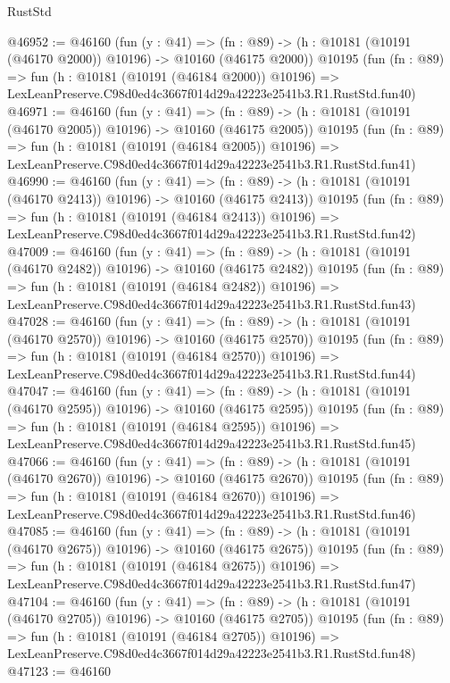 \begin{lexlean}{RustStd}
\begin{coremodule}
@46952 := @46160
    (fun (y : @41) =>
    (fn : @89) -> (h : @10181 (@10191 (@46170 @2000)) @10196) -> @10160 (@46175 @2000))
    @10195
    (fun (fn : @89) =>
    fun (h : @10181 (@10191 (@46184 @2000)) @10196) =>
    LexLeanPreserve.C98d0ed4c3667f014d29a42223e2541b3.R1.RustStd.fun40)
@46971 := @46160
    (fun (y : @41) =>
    (fn : @89) -> (h : @10181 (@10191 (@46170 @2005)) @10196) -> @10160 (@46175 @2005))
    @10195
    (fun (fn : @89) =>
    fun (h : @10181 (@10191 (@46184 @2005)) @10196) =>
    LexLeanPreserve.C98d0ed4c3667f014d29a42223e2541b3.R1.RustStd.fun41)
@46990 := @46160
    (fun (y : @41) =>
    (fn : @89) -> (h : @10181 (@10191 (@46170 @2413)) @10196) -> @10160 (@46175 @2413))
    @10195
    (fun (fn : @89) =>
    fun (h : @10181 (@10191 (@46184 @2413)) @10196) =>
    LexLeanPreserve.C98d0ed4c3667f014d29a42223e2541b3.R1.RustStd.fun42)
@47009 := @46160
    (fun (y : @41) =>
    (fn : @89) -> (h : @10181 (@10191 (@46170 @2482)) @10196) -> @10160 (@46175 @2482))
    @10195
    (fun (fn : @89) =>
    fun (h : @10181 (@10191 (@46184 @2482)) @10196) =>
    LexLeanPreserve.C98d0ed4c3667f014d29a42223e2541b3.R1.RustStd.fun43)
@47028 := @46160
    (fun (y : @41) =>
    (fn : @89) -> (h : @10181 (@10191 (@46170 @2570)) @10196) -> @10160 (@46175 @2570))
    @10195
    (fun (fn : @89) =>
    fun (h : @10181 (@10191 (@46184 @2570)) @10196) =>
    LexLeanPreserve.C98d0ed4c3667f014d29a42223e2541b3.R1.RustStd.fun44)
@47047 := @46160
    (fun (y : @41) =>
    (fn : @89) -> (h : @10181 (@10191 (@46170 @2595)) @10196) -> @10160 (@46175 @2595))
    @10195
    (fun (fn : @89) =>
    fun (h : @10181 (@10191 (@46184 @2595)) @10196) =>
    LexLeanPreserve.C98d0ed4c3667f014d29a42223e2541b3.R1.RustStd.fun45)
@47066 := @46160
    (fun (y : @41) =>
    (fn : @89) -> (h : @10181 (@10191 (@46170 @2670)) @10196) -> @10160 (@46175 @2670))
    @10195
    (fun (fn : @89) =>
    fun (h : @10181 (@10191 (@46184 @2670)) @10196) =>
    LexLeanPreserve.C98d0ed4c3667f014d29a42223e2541b3.R1.RustStd.fun46)
@47085 := @46160
    (fun (y : @41) =>
    (fn : @89) -> (h : @10181 (@10191 (@46170 @2675)) @10196) -> @10160 (@46175 @2675))
    @10195
    (fun (fn : @89) =>
    fun (h : @10181 (@10191 (@46184 @2675)) @10196) =>
    LexLeanPreserve.C98d0ed4c3667f014d29a42223e2541b3.R1.RustStd.fun47)
@47104 := @46160
    (fun (y : @41) =>
    (fn : @89) -> (h : @10181 (@10191 (@46170 @2705)) @10196) -> @10160 (@46175 @2705))
    @10195
    (fun (fn : @89) =>
    fun (h : @10181 (@10191 (@46184 @2705)) @10196) =>
    LexLeanPreserve.C98d0ed4c3667f014d29a42223e2541b3.R1.RustStd.fun48)
@47123 := @46160

\end{coremodule}
\end{lexlean}
